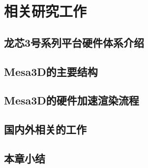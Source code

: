 

\chapter{相关研究工作}
\label{cha:Related-Research}

\section{龙芯3号系列平台硬件体系介绍}


\section{Mesa3D的主要结构}


\section{Mesa3D的硬件加速渲染流程}

\label{sec:Mesa3D-Flow}

\section{国内外相关的工作}


\section{本章小结}

